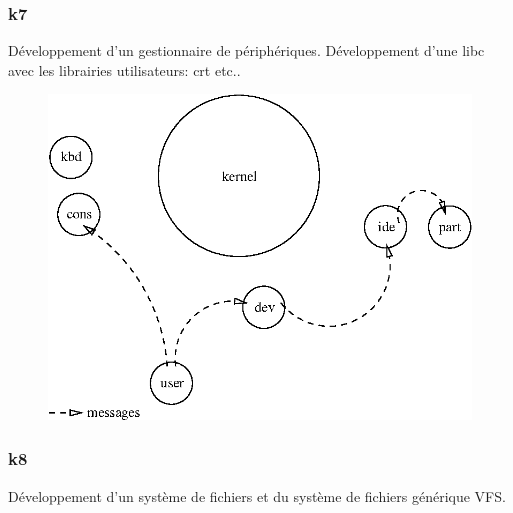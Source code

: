 \documentclass[10pt,a4wide]{article}
\begin{document}
\newpage

\subsubsection{k7}

D\'eveloppement d'un gestionnaire de p\'eriph\'eriques. D\'eveloppement
d'une libc avec les librairies utilisateurs: crt etc..

\vspace{5cm}

\begin{figure}[h]
\centerline{\includegraphics{figures/k7.eps}}
\end{figure}

\newpage

\subsubsection{k8}

D\'eveloppement d'un syst\`eme de fichiers et du syst\`eme de fichiers
g\'en\'erique VFS.

\vspace{5cm}
\end{document}
